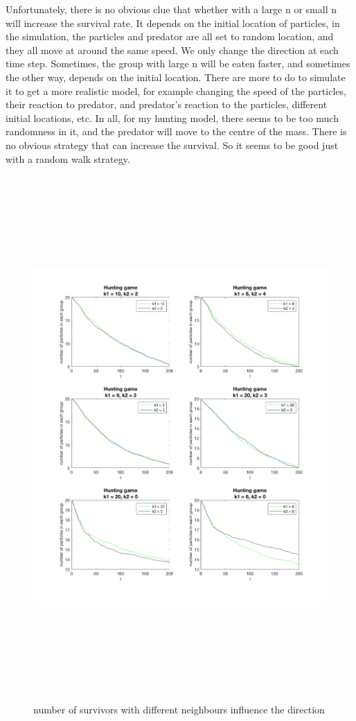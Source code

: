 \documentclass[12pt]{article}
\begin{document}
Unfortunately, there is no obvious clue that whether with a large n or small n will increase the survival rate. It depends on the initial location of particles, in the simulation, the particles and predator are all set to random location, and they all move at around the same speed. We only change the direction at each time step. Sometimes, the group with large n will be eaten faster, and sometimes the other way, depends on the initial location. There are more to do to simulate it to get a more realistic model, for example changing the speed of the particles, their reaction to predator, and predator's reaction to the particles, different initial locations, etc. In all, for my hunting model, there seems to be too much randomness in it, and the predator will move to the centre of the mass. There is no obvious strategy that can increase the survival. So it seems to be good just with a random walk strategy. \par


\begin{figure}[H] %
\centering
\includegraphics[width = 16 cm, height = 20cm]{hunt.png}
\caption{number of survivors with different neighbours influence the direction}
\label{fig:huntpic}
\end{figure}
\end{document}
